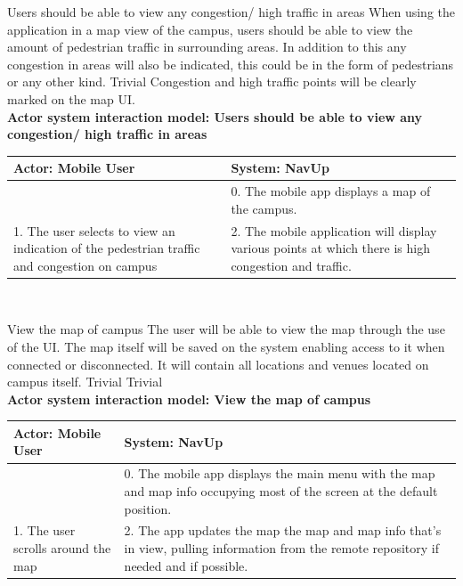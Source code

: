 \FuncReq
{Users should be able to view any congestion/ high traffic in areas}
{When using the application in a map view of the campus, users should be able to view the amount of pedestrian traffic in surrounding areas. In addition to this any congestion in areas will also be indicated, this could be in the form of pedestrians or any other kind.}
{Trivial}
{Congestion and high traffic points will be clearly marked on the map UI.}
\bigskip
	\\
    \textbf{Actor system interaction model: Users should be able to view any congestion/ high traffic in areas}\\
    \begin{tabular}{ | p{6cm} | p{6cm} |}
    \hline
    Actor: Mobile User & System: NavUp \\ \hline
    & 0. The mobile app displays a map of the campus.\\ \hline
    1. The user selects to view an indication of the pedestrian traffic and congestion on campus & 2. The mobile application will display various points at which there is high congestion and traffic.\\ \hline
    \end{tabular}
\\
\bigskip

\FuncReq
{View the map of campus}
{The user will be able to view the map through the use of the UI. The map itself will be saved on the system enabling access to it when connected or disconnected. It will contain all locations and venues located on campus itself.}
{Trivial}
{Trivial}
    \\
    \textbf{Actor system interaction model: View the map of campus }\\
    \begin{tabular}{ | p{6cm} | p{6cm} |}
    \hline
    Actor: Mobile User & System: NavUp \\ \hline
     & 0. The mobile app displays the main menu with the map and map info occupying most of the screen at the default position.\\ \hline
    1. The user scrolls around the map & 2. The app updates the map the map and map info that's in view, pulling information from the remote repository if needed and if possible.\\ \hline
    
    \end{tabular}
\\
\bigskip

